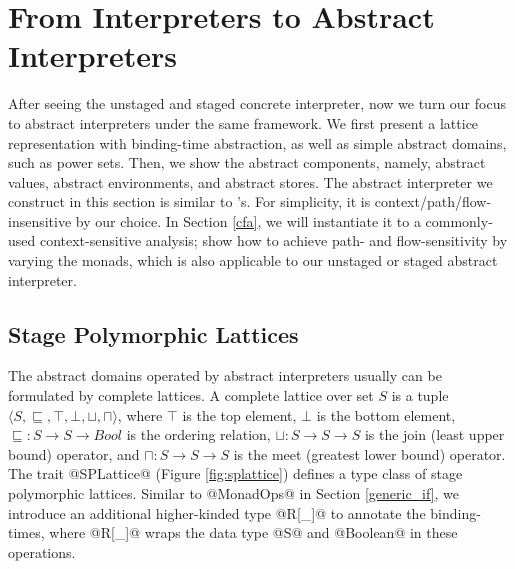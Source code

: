 \section{From Interpreters to Abstract Interpreters} \label{unstaged_abs}

After seeing the unstaged and staged concrete interpreter, now we turn our
focus to abstract interpreters under the same framework. We first present a
lattice representation with binding-time abstraction, as well as simple
abstract domains, such as power sets.  Then, we show the abstract
components, namely, abstract values, abstract environments, and abstract stores.
The abstract interpreter we construct in this section is similar to
\citet{DBLP:journals/pacmpl/DaraisLNH17}'s. For simplicity, it is
context/path/flow-insensitive by our choice. In Section \ref{cfa}, we will
instantiate it to a commonly-used context-sensitive analysis;
\citet{Darais:2015:GTM:2814270.2814308} show how to achieve path- and
flow-sensitivity by varying the monads, which is also applicable to our
unstaged or staged abstract interpreter.

\subsection{Stage Polymorphic Lattices} \label{stagedpoly_lat}

The abstract domains operated by abstract interpreters usually can be
formulated by complete lattices.
A complete lattice over set $S$ is a tuple $\langle S, \sqsubseteq, \top,
\bot, \sqcup, \sqcap \rangle$, where $\top$ is the top element, $\bot$ is the
bottom element, $\sqsubseteq : S \to S \to Bool$ is the
ordering relation, $\sqcup: S \to S \to S$ is the join (least upper bound)
operator, and $\sqcap: S \to S \to S$ is the meet (greatest lower bound)
operator. The trait @SPLattice@ (Figure \ref{fig:splattice}) defines a type
class of stage polymorphic lattices. Similar to @MonadOps@ in Section
\ref{generic_if}, we introduce an additional higher-kinded type @R[_]@ to
annotate the binding-times, where @R[_]@ wraps the data type @S@ and @Boolean@
in these operations.

